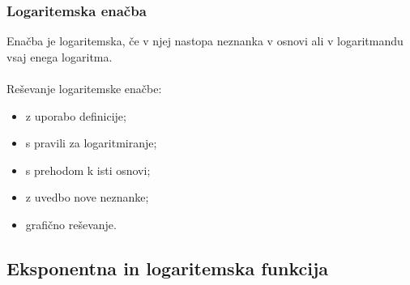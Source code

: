         \begin{frame}
            \frametitle{Logaritemska enačba}

            Enačba je logaritemska, če v njej nastopa neznanka v osnovi ali v logaritmandu vsaj enega logaritma.\\
            ~\\
            Reševanje logaritemske enačbe:
            \begin{itemize}
                \item z uporabo definicije;
                \item s pravili za logaritmiranje;
                \item s prehodom k isti osnovi;
                \item z uvedbo nove neznanke;
                \item grafično reševanje.
            \end{itemize}


        \end{frame}

    \subsection{Eksponentna in logaritemska funkcija}

